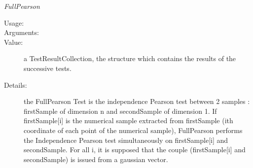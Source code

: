 \begin{description}
\begin{description}
\item \textit{FullPearson}
\begin{description}
\item[Usage:] \rule{0pt}{1em}
\item[Arguments:] \rule{0pt}{1em}
\item[Value:]  a TestResultCollection, the structure which contains the results of the successive tests.
\item[Details:] the FullPearson Test is the independence Pearson test between 2 samples : firstSample of dimension n and secondSample of dimension 1. If firstSample[i] is the numerical sample extracted from firstSample (ith coordinate of each point of the numerical sample), FullPearson performs the Independence Pearson test simultaneously on firstSample[i] and secondSample. For all i, it is supposed that the couple (firstSample[i] and secondSample) is issued from a gaussian  vector.
\end{description}
\bigskip


\end{description}
\end{description}
